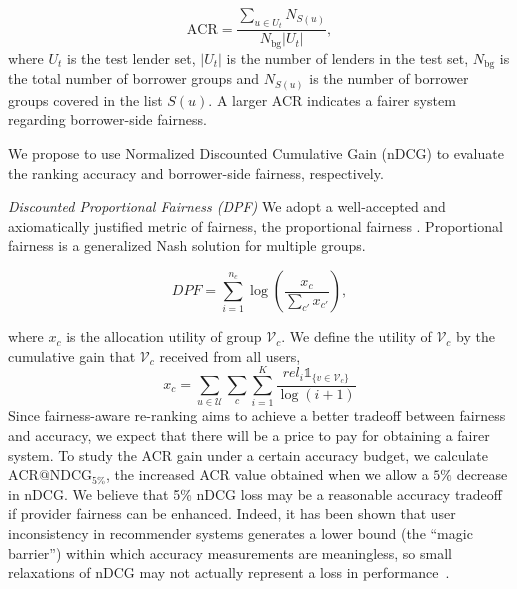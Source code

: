 \begin{equation}
    \text{ACR}=\frac{\sum_{u\in U_t}N_{S(u)}}{N_\text{bg}|U_t|},
\end{equation}
where $U_t$ is the test lender set, $|U_t|$ is the number of lenders in the test set, $N_\text{bg}$ is the total number of borrower groups and $N_{S(u)}$ is the number of borrower groups covered in the list $S(u)$. A larger ACR indicates a fairer system regarding borrower-side fairness.

We propose to use Normalized Discounted Cumulative Gain (nDCG) to evaluate the ranking accuracy and borrower-side fairness, respectively.


\textit{Discounted Proportional Fairness (DPF)}
We adopt a well-accepted and axiomatically justified metric of fairness, the proportional fairness \cite{kelly1998rate}. Proportional fairness is a generalized Nash solution for multiple groups.

\begin{equation*}
    DPF=\sum_{i=1}^{n_c}\log\left(\frac{x_c}{\sum_{c'}x_{c'}}\right),
\end{equation*}

where $x_c$ is the allocation utility of group $\mathcal V_c$. We define the utility of $\mathcal V_c$ by the cumulative gain that $\mathcal V_c$ received from all users,
\begin{equation*}
x_c=\sum_{u\in\mathcal U}\sum_{c}\sum_{i=1}^K\frac{{rel}_i\mathds{1}_{\{v\in \mathcal V_{c}\}}}{\log(i+1)}
\end{equation*}
Since fairness-aware re-ranking aims to achieve a better tradeoff between fairness and accuracy, we expect that there will be a price to pay for obtaining a fairer system. To study the ACR gain under a certain accuracy budget, we calculate $\text{ACR@NDCG}_{5\%}$, the increased ACR value obtained when we allow a $5\%$ decrease in nDCG. We believe that 5\% nDCG loss may be a reasonable accuracy tradeoff if provider fairness can be enhanced. Indeed, it has been shown that user inconsistency in recommender systems generates a lower bound (the ``magic barrier'') within which accuracy measurements are meaningless, so small relaxations of nDCG may not actually represent a loss in performance~\cite{said2012estimating}.

